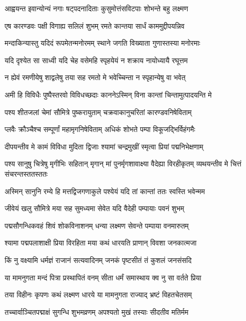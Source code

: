 \twolineshloka
{आह्वयन्त इवान्योन्यं नगाः षट्पदनादिताः}
{कुसुमोत्तंसविटपाः शोभन्ते बहु लक्ष्मण} %

\twolineshloka
{एष कारण्डवः पक्षी विगाह्य सलिलं शुभम्}
{रमते कान्तया सार्धं काममुद्दीपयन्निव} %

\twolineshloka
{मन्दाकिन्यास्तु यदिदं रूपमेतन्मनोरमम्}
{स्थाने जगति विख्याता गुणास्तस्या मनोरमाः} %

\twolineshloka
{यदि दृश्येत सा साध्वी यदि चेह वसेमहि}
{स्पृहयेयं न शक्राय नायोध्यायै रघूत्तम} %

\twolineshloka
{न ह्येवं रमणीयेषु शाद्वलेषु तया सह}
{रमतो मे भवेच्चिन्ता न स्पृहान्येषु वा भवेत्} %

\twolineshloka
{अमी हि विविधैः पुष्पैस्तरवो विविधच्छदाः}
{काननेऽस्मिन् विना कान्तां चिन्तामुत्पादयन्ति मे} %

\twolineshloka
{पश्य शीतजलां चेमां सौमित्रे पुष्करायुताम्}
{चक्रवाकानुचरितां कारण्डवनिषेविताम्} %

\twolineshloka
{प्लवैः क्रौञ्चैश्च सम्पूर्णां महामृगनिषेविताम्}
{अधिकं शोभते पम्पा विकूजद्भिर्विहंगमैः} %

\twolineshloka
{दीपयन्तीव मे कामं विविधा मुदिता द्विजाः}
{श्यामां चन्द्रमुखीं स्मृत्वा प्रियां पद्मनिभेक्षणाम्} %

\threelineshloka
{पश्य सानुषु चित्रेषु मृगीभिः सहितान् मृगान्}
{मां पुनर्मृगशावाक्ष्या वैदेह्या विरहीकृतम्}
{व्यथयन्तीव मे चित्तं संचरन्तस्ततस्ततः} %

\twolineshloka
{अस्मिन् सानुनि रम्ये हि मत्तद्विजगणाकुले}
{पश्येयं यदि तां कान्तां ततः स्वस्ति भवेन्मम} %

\twolineshloka
{जीवेयं खलु सौमित्रे मया सह सुमध्यमा}
{सेवेत यदि वैदेही पम्पायाः पवनं शुभम्} %

\twolineshloka
{पद्मसौगन्धिकवहं शिवं शोकविनाशनम्}
{धन्या लक्ष्मण सेवन्ते पम्पाया वनमारुतम्} %

\twolineshloka
{श्यामा पद्मपलाशाक्षी प्रिया विरहिता मया}
{कथं धारयति प्राणान् विवशा जनकात्मजा} %

\twolineshloka
{किं नु वक्ष्यामि धर्मज्ञं राजानं सत्यवादिनम्}
{जनकं पृष्टसीतं तं कुशलं जनसंसदि} %

\twolineshloka
{या मामनुगता मन्दं पित्रा प्रस्थापितं वनम्}
{सीता धर्मं समास्थाय क्व नु सा वर्तते प्रिया} %

\twolineshloka
{तया विहीनः कृपणः कथं लक्ष्मण धारये}
{या मामनुगता राज्याद् भ्रष्टं विहतचेतसम्} %

\twolineshloka
{तच्चार्वाञ्चितपद्माक्षं सुगन्धि शुभमव्रणम्}
{अपश्यतो मुखं तस्याः सीदतीव मतिर्मम} %

